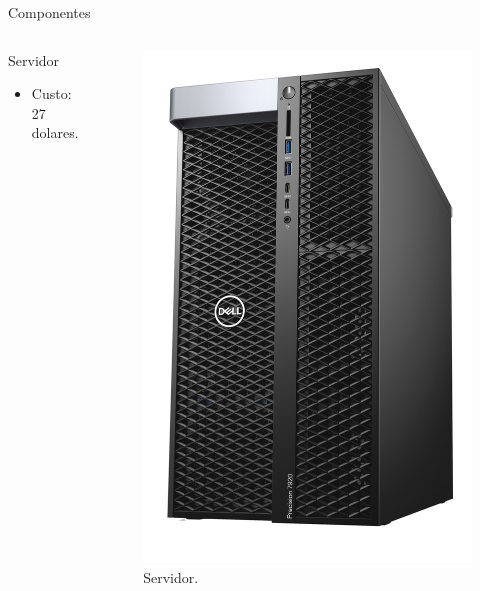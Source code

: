 \documentclass{if-beamer}
\begin{document}
\begin{frame}{Componentes}
	
	\begin{columns}
		
		\begin{column}{0.6\textwidth}
			
			\begin{block}{Servidor}
				
				\begin{itemize}
					\item Custo: 27 dolares.
				\end{itemize}
				
			\end{block}
			
		\end{column}
		
		\begin{column}{0.4\textwidth}
			
			\begin{figure}[H]
				\centering
				\includegraphics[width=0.7\linewidth]{img/servidor}
				\caption{Servidor.}
				\label{fig:servidor}
			\end{figure}
			
		\end{column}
		
	\end{columns}
	
	
\end{frame}
\end{document}
